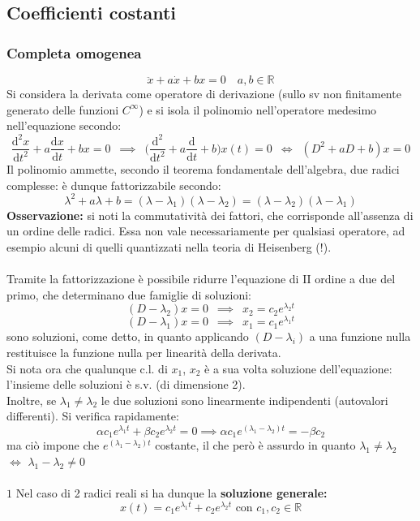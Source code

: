 \documentclass[10pt, oneside]{book}
\theoremstyle{plain}
\begin{document}
\subsection{Coefficienti costanti}
\subsubsection*{Completa omogenea}
\[\ddot x + a \dot x + b x = 0 \quad a,b \in \mathbb{R}\]
Si considera la derivata come operatore di derivazione (sullo sv non finitamente generato delle funzioni $C^{\infty}$) e si isola il polinomio nell'operatore medesimo nell'equazione secondo:
\[\frac{\textrm{d}^2x}{\textrm{d}t^2} + a \frac{\textrm{d}x}{\textrm{d}t} + b x = 0 \enspace \implies \enspace \big(\frac{\textrm{d}^2}{\textrm{d}t^2} + a \frac{\textrm{d}}{\textrm{d}t} + b\big) x(t) = 0 \enspace \Leftrightarrow \enspace (D^2 + aD +b) x = 0\]
Il polinomio ammette, secondo il teorema fondamentale dell'algebra, due radici complesse: è dunque fattorizzabile secondo:
\[\lambda^2 + a\lambda + b = (\lambda - \lambda_1) (\lambda - \lambda_2) = (\lambda - \lambda_2) (\lambda - \lambda_1)\]
\textbf{Osservazione:} si noti la commutatività dei fattori, che corrisponde all'assenza di un ordine delle radici. Essa non vale necessariamente per qualsiasi operatore, ad esempio alcuni di quelli quantizzati nella teoria di Heisenberg (!).
\\~\\Tramite la fattorizzazione è possibile ridurre l'equazione di II ordine a due del primo, che determinano due famiglie di soluzioni:
\[(D - \lambda_2)x = 0 \enspace \implies \enspace x_2 = c_2 e^{\lambda_2 t}\]
\[(D - \lambda_1)x = 0 \enspace \implies \enspace x_1 = c_1 e^{\lambda_1 t}\]
sono soluzioni, come detto, in quanto applicando $(D - \lambda_i)$ a una funzione nulla restituisce la funzione nulla per linearità della derivata.
\\Si nota ora che qualunque c.l. di $x_1$, $x_2$ è a sua volta soluzione dell'equazione: l'insieme delle soluzioni è s.v. (di dimensione 2).
\\Inoltre, se $\lambda_1 \neq \lambda_2$ le due soluzioni sono linearmente indipendenti (autovalori differenti). Si verifica rapidamente:
\[\alpha c_1 e^{\lambda_1 t} + \beta c_2 e^{\lambda_2 t} = 0 \implies \alpha c_1 e^{(\lambda_1-\lambda_2) t} = - \beta c_2\]
ma ciò impone che $e^{(\lambda_1-\lambda_2) t}$ costante, il che però è assurdo in quanto $\lambda_1 \neq \lambda_2$ $\Leftrightarrow$ $\lambda_1 - \lambda_2 \neq 0$
\\~\\$\boxed{1}$ Nel caso di 2 radici reali si ha dunque la \textbf{soluzione generale:}
\[\boxed{x(t) = c_1 e^{\lambda_1 t} + c_2 e^{\lambda_2 t}} \textrm{ con } c_1, c_2 \in \mathbb{R}\]
\end{document}
